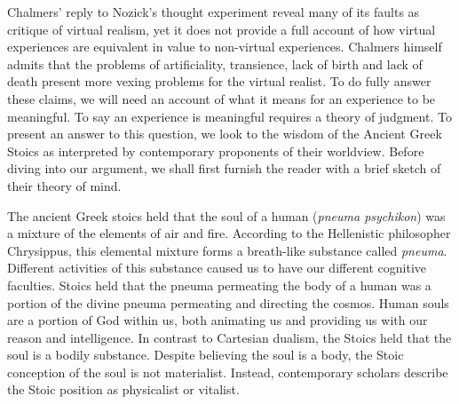 Chalmers' reply to Nozick's thought experiment reveal many of its faults as critique of virtual realism, yet it does not provide a full account of how virtual experiences are equivalent in value to non-virtual experiences. Chalmers himself admits that the problems of artificiality, transience, lack of birth and lack of death present more vexing problems for the virtual realist. To do fully answer these claims, we will need an account of what it means for an experience to be meaningful. To say an experience is meaningful requires a theory of judgment. To present an answer to this question, we look to the wisdom of the Ancient Greek Stoics as interpreted by contemporary proponents of their worldview. Before diving into our argument, we shall first furnish the reader with a brief sketch of their theory of mind.

The ancient Greek stoics held that the soul of a human (\textit{pneuma psychikon}) was a mixture of the elements of air and fire. According to the  Hellenistic philosopher Chrysippus,
this elemental mixture forms a breath-like substance called \textit{pneuma}.  Different activities of this substance caused us to have our different cognitive faculties. Stoics held that the pneuma permeating the body of a human  was a portion of the divine pneuma permeating and directing the cosmos. Human souls are a portion of God within us, both animating us and providing us with our reason and intelligence. In contrast to Cartesian dualism, the Stoics held that the soul is a bodily substance. Despite believing the soul is a body, the Stoic conception of the soul is not materialist. Instead, contemporary scholars describe the Stoic position as physicalist or vitalist.  \cite{gould2012the} 

